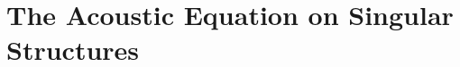 \chapter{The Acoustic Equation on Singular Structures} \label{ch:ScalarSystem}











\begin{subappendices}







\end{subappendices}